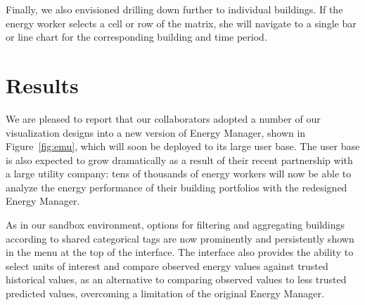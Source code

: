 \documentclass[journal]{vgtc}                %
\newcommand{\tm}[1]{\textcolor{red}{#1}}
\newcommand{\mb}[1]{\textcolor{blue}{#1}}
\newcommand{\jn}[1]{\textcolor{darkGreen}{#1}}
\begin{document}
Finally, we also envisioned drilling down further to individual buildings. 
If the energy worker selects a cell or row of the matrix, she will navigate to a single bar or line chart for the corresponding building and time period.



\section{Results}
\label{results}


We are pleased to report that our collaborators adopted a number of our visualization designs into a new version of Energy Manager, shown in Figure~\ref{fig:emu}, which will soon be deployed to its large user base.
The user base is also expected to grow dramatically as a result of their recent partnership with a large utility company: tens of thousands of energy workers will now be able to analyze the energy performance of their building portfolios with the redesigned Energy Manager.

As in our sandbox environment, options for filtering and aggregating buildings according to shared categorical tags are now prominently and persistently shown in the menu at the top of the interface. 
The interface also provides the ability to select units of interest and compare observed energy values against trusted historical values, as an alternative to comparing observed values to less trusted predicted values, overcoming a limitation of the original Energy Manager.
\end{document}
